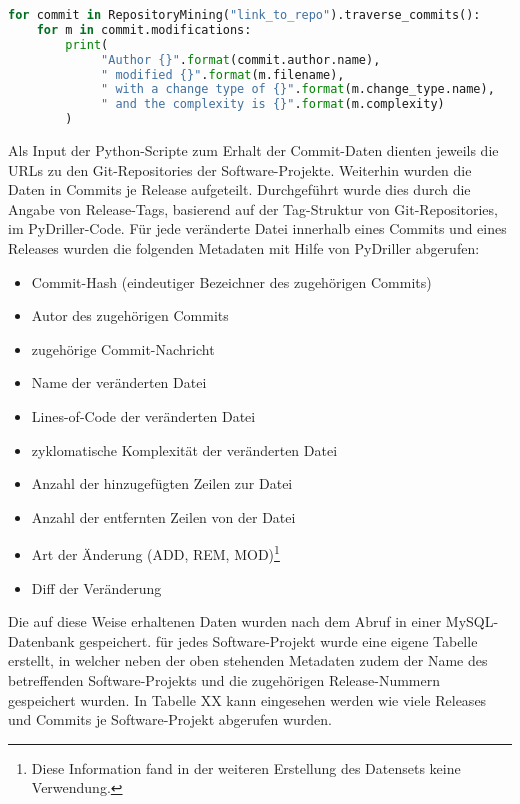 \begin{lstlisting}[language=Python, caption=Beispielhafter PyDriller-Code zur Ausgabe von Metadaten von Commits, frame=single]
for commit in RepositoryMining("link_to_repo").traverse_commits(): 
	for m in commit.modifications: 
		print( 
		     "Author {}".format(commit.author.name), 
		     " modified {}".format(m.filename), 
		     " with a change type of {}".format(m.change_type.name), 
		     " and the complexity is {}".format(m.complexity) 
		)
\end{lstlisting}

Als Input der Python-Scripte zum Erhalt der Commit-Daten dienten jeweils die URLs zu den Git-Repositories der Software-Projekte. Weiterhin wurden die Daten in Commits je Release aufgeteilt. Durchgeführt wurde dies durch die Angabe von Release-Tags, basierend auf der Tag-Struktur von Git-Repositories, im PyDriller-Code. Für jede veränderte Datei innerhalb eines Commits und eines Releases wurden die folgenden Metadaten mit Hilfe von PyDriller abgerufen:

\begin{multicols}{2}
\begin{itemize}
\item Commit-Hash (eindeutiger Bezeichner des zugehörigen Commits)
\item Autor des zugehörigen Commits
\item zugehörige Commit-Nachricht
\item Name der veränderten Datei
\item Lines-of-Code der veränderten Datei
\item zyklomatische Komplexität der veränderten Datei
\item Anzahl der hinzugefügten Zeilen zur Datei
\item Anzahl der entfernten Zeilen von der Datei
\item Art der Änderung (ADD, REM, MOD)\footnote{Diese Information fand in der weiteren Erstellung des Datensets keine Verwendung.}
\item Diff der Veränderung
\end{itemize}
\end{multicols}

Die auf diese Weise erhaltenen Daten wurden nach dem Abruf in einer MySQL-Datenbank gespeichert. für jedes Software-Projekt wurde eine eigene Tabelle erstellt, in welcher neben der oben stehenden Metadaten zudem der Name des betreffenden Software-Projekts und die zugehörigen Release-Nummern gespeichert wurden. In Tabelle XX kann eingesehen werden wie viele Releases und Commits je Software-Projekt abgerufen wurden.

